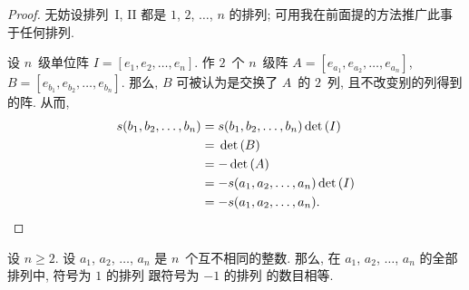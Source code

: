 \documentclass[../libro.tex]{subfiles}
\begin{document}
\begin{proof}
    无妨设排列~I, II 都是
    \(1\), \(2\), \(\dots\), \(n\) 的排列;
    可用我在前面提的方法推广此事于任何排列.

    设 \(n\)~级单位阵
    \(I = [e_1, e_2, \dots, e_n]\).
    作 \(2\)~个 \(n\)~级阵
    \(A = [e_{a_1}, e_{a_2}, \dots, e_{a_n}]\),
    \(B = [e_{b_1}, e_{b_2}, \dots, e_{b_n}]\).
    那么, \(B\) 可被认为是交换了 \(A\)~的 \(2\)~列,
    且不改变别的列得到的阵.
    从而,
    \begin{align*}
        s(b_1, b_2, \dots, b_n)
        = {} & s(b_1, b_2, \dots, b_n) \det {(I)}
        \\
        = {} & \det {(B)}
        \\
        = {} & {-} \det {(A)}
        \\
        = {} & {-} s(a_1, a_2, \dots, a_n) \det {(I)}
        \\
        = {} & {-} s(a_1, a_2, \dots, a_n).
        \qedhere
    \end{align*}
\end{proof}

\begin{theorem}
    设 \(n \geq 2\).
    设 \(a_1\), \(a_2\), \(\dots\), \(a_n\) 是
    \(n\)~个互不相同的整数.
    那么, 在
    \(a_1\), \(a_2\), \(\dots\), \(a_n\) 的全部排列中,
    符号为 \(1\) 的排列%
    跟符号为 \(-1\) 的排列%
    的数目相等.
\end{theorem}
\end{document}
